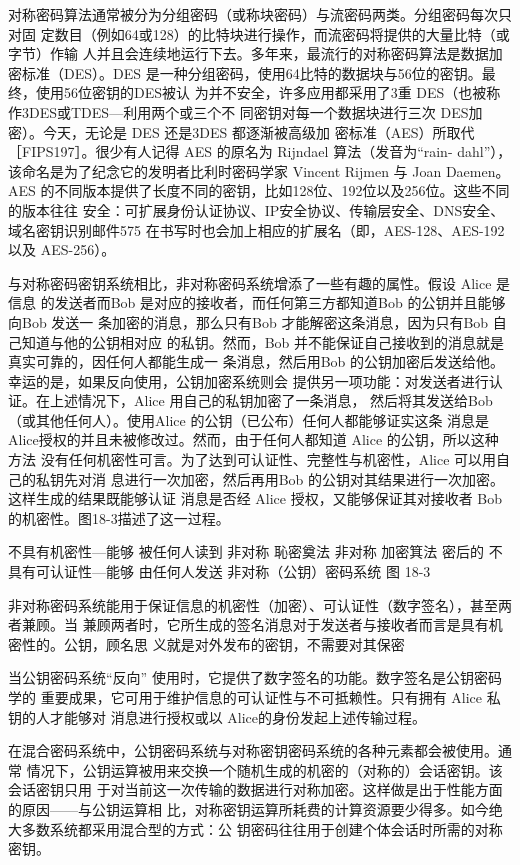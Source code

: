 对称密码算法通常被分为分组密码（或称块密码）与流密码两类。分组密码每次只对固
定数目（例如64或128）的比特块进行操作，而流密码将提供的大量比特（或字节）作输
人并且会连续地运行下去。多年来，最流行的对称密码算法是数据加密标准（DES）。DES
是一种分组密码，使用64比特的数据块与56位的密钥。最终，使用56位密钥的DES被认
为并不安全，许多应用都采用了3重 DES（也被称作3DES或TDES—利用两个或三个不
同密钥对每一个数据块进行三次 DES加密）。今天，无论是 DES 还是3DES 都逐渐被高级加
密标准（AES）所取代［FIPS197］。很少有人记得 AES 的原名为 Rijndael 算法（发音为“rain-
dahl”），该命名是为了纪念它的发明者比利时密码学家 Vincent Rijmen 与 Joan Daemen。 AES
的不同版本提供了长度不同的密钥，比如128位、192位以及256位。这些不同的版本往往
安全：可扩展身份认证协议、IP安全协议、传输层安全、DNS安全、域名密钥识别邮件575
在书写时也会加上相应的扩展名（即，AES-128、AES-192以及 AES-256）。

与对称密码密钥系统相比，非对称密码系统增添了一些有趣的属性。假设 Alice 是信息
的发送者而Bob 是对应的接收者，而任何第三方都知道Bob 的公钥并且能够向Bob 发送一
条加密的消息，那么只有Bob 才能解密这条消息，因为只有Bob 自己知道与他的公钥相对应
的私钥。然而，Bob 并不能保证自己接收到的消息就是真实可靠的，因任何人都能生成一
条消息，然后用Bob 的公钥加密后发送给他。幸运的是，如果反向使用，公钥加密系统则会
提供另一项功能：对发送者进行认证。在上述情况下，Alice 用自己的私钥加密了一条消息，
然后将其发送给Bob（或其他任何人）。使用Alice 的公钥（已公布）任何人都能够证实这条
消息是 Alice授权的并且未被修改过。然而，由于任何人都知道 Alice 的公钥，所以这种方法
没有任何机密性可言。为了达到可认证性、完整性与机密性，Alice 可以用自己的私钥先对消
息进行一次加密，然后再用Bob 的公钥对其结果进行一次加密。这样生成的结果既能够认证
消息是否经 Alice 授权，又能够保证其对接收者 Bob 的机密性。图18-3描述了这一过程。

不具有机密性—能够
被任何人读到
非对称
恥密奠法
非对称
加密箕法
密后的
不具有可认证性—能够
由任何人发送
非对称（公钥）密码系统
图 18-3

非对称密码系统能用于保证信息的机密性（加密）、可认证性（数字签名），甚至两者兼顾。当
兼顾两者时，它所生成的签名消息对于发送者与接收者而言是具有机密性的。公钥，顾名思
义就是对外发布的密钥，不需要对其保密

当公钥密码系统“反向” 使用时，它提供了数字签名的功能。数字签名是公钥密码学的
重要成果，它可用于维护信息的可认证性与不可抵赖性。只有拥有 Alice 私钥的人才能够对
消息进行授权或以 Alice的身份发起上述传输过程。

在混合密码系统中，公钥密码系统与对称密钥密码系统的各种元素都会被使用。通常
情况下，公钥运算被用来交换一个随机生成的机密的（对称的）会话密钥。该会话密钥只用
于对当前这一次传输的数据进行对称加密。这样做是出于性能方面的原因——与公钥运算相
比，对称密钥运算所耗费的计算资源要少得多。如今绝大多数系统都采用混合型的方式：公
钥密码往往用于创建个体会话时所需的对称密钥。

